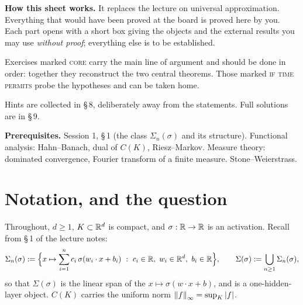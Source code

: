\documentclass[11pt,a4paper]{article}
\begin{document}

\vspace{6pt}

\begin{plainbox}
\textbf{How this sheet works.} It replaces the lecture on universal approximation. Everything that
would have been proved at the board is proved here by you. Each part opens with a short box giving
the objects and the external results you may use \emph{without proof}; everything else is to be
established.

\smallskip
Exercises marked \textsc{core} carry the main line of argument and should be done in order: together
they reconstruct the two central theorems. Those marked \textsc{if time permits} probe the
hypotheses and can be taken home.

\smallskip
Hints are collected in §\,8, deliberately away from the statements. Full solutions are in §\,9.

\smallskip
\textbf{Prerequisites.} Session 1, §\,1 (the class $\Sigma_n(\sigma)$ and its structure).
Functional analysis: Hahn--Banach, dual of $C(K)$, Riesz--Markov. Measure theory: dominated
convergence, Fourier transform of a finite measure. Stone--Weierstrass.
\end{plainbox}

\newpage
\tableofcontents
\newpage

\section{Notation, and the question}

\begin{setting}
Throughout, $d \ge 1$, $K \subset \mathbb{R}^d$ is compact, and $\sigma : \mathbb{R} \to \mathbb{R}$ is an activation.
Recall from §\,1 of the lecture notes:
\[
\Sigma_n(\sigma) := \Big\{ x \mapsto \sum_{i=1}^n c_i\, \sigma(w_i \cdot x + b_i)
\ :\ c_i \in \mathbb{R},\ w_i \in \mathbb{R}^d,\ b_i \in \mathbb{R} \Big\},
\qquad
\Sigma(\sigma) := \bigcup_{n \ge 1} \Sigma_n(\sigma),
\]
so that $\Sigma(\sigma)$ is the linear span of the 
$x \mapsto \sigma(w\cdot x + b)$, and is a one-hidden-layer object. $C(K)$ carries the uniform norm
$\left\lVert f \right\rVert_\infty = \sup_K\left\lvert f \right\rvert$.
\end{setting}
\end{document}
